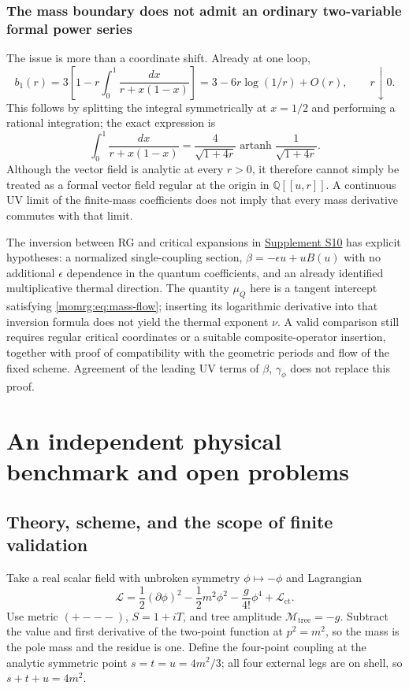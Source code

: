 \documentclass[11pt,a4paper,oneside]{article}
\theoremstyle{plain}
\theoremstyle{definition}
\theoremstyle{remark}
\newcommand{\Q}{\mathbb Q}
\numberwithin{equation}{section}
\newcommand{\otherref}[2]{\href{#1.pdf}{#2}}
\begin{document}
\subsubsection{The mass boundary does not admit an ordinary two-variable formal power series}
The issue is more than a coordinate shift. Already at one loop,
\begin{equation}\label{momrg:eq:b1-nonanalytic}
 b_1(r)=3\left[1-r\int_0^1\frac{dx}{r+x(1-x)}\right]
       =3-6r\log(1/r)+O(r),\qquad r\downarrow0.
\end{equation}
This follows by splitting the integral symmetrically at $x=1/2$ and performing a rational integration;
the exact expression is
\[
 \int_0^1\frac{dx}{r+x(1-x)}
 =\frac4{\sqrt{1+4r}}
       \operatorname{artanh}\frac1{\sqrt{1+4r}}.
\]
Although the vector field is analytic at every $r>0$, it therefore cannot simply be treated as
a formal vector field regular at the origin in $\Q[[u,r]]$.
A continuous UV limit of the finite-mass coefficients does not imply that every mass derivative commutes with that limit.

The inversion between RG and critical expansions in \otherref{feynman_periods_supplement_en}{Supplement S10} has explicit hypotheses:
a normalized single-coupling section,
$\beta=-\epsilon u+uB(u)$ with no additional $\epsilon$ dependence in the quantum coefficients,
and an already identified multiplicative thermal direction.
The quantity $\mu_Q$ here is a tangent intercept satisfying \eqref{momrg:eq:mass-flow};
inserting its logarithmic derivative into that inversion formula does not yield the thermal exponent $\nu$.
A valid comparison still requires regular critical coordinates or a suitable composite-operator insertion,
together with proof of compatibility with the geometric periods and flow of the fixed scheme.
Agreement of the leading UV terms of $\beta$, $\gamma_\phi$ does not replace this proof.


\endgroup

\section{An independent physical benchmark and open problems}\label{ch:physics}

\begingroup


\subsection{Theory, scheme, and the scope of finite validation}
Take a real scalar field with unbroken symmetry $\phi\mapsto-\phi$ and Lagrangian
\begin{equation}
 \mathcal L=\frac12(\partial\phi)^2-\frac12m^2\phi^2
 -\frac{g}{4!}\phi^4+\mathcal L_{\mathrm{ct}}.
\end{equation}
Use metric $(+---)$, $S=1+iT$, and tree amplitude $\mathcal M_{\mathrm{tree}}=-g$. Subtract the value and first derivative of the two-point function at $p^2=m^2$, so the mass is the pole mass and the residue is one. Define the four-point coupling at the analytic symmetric point $s=t=u=4m^2/3$; all four external legs are on shell, so $s+t+u=4m^2$.
\end{document}
